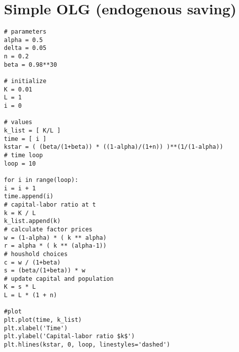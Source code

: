 \documentclass[10pt,a4paper]{book}
\theoremstyle{definition}\newtheorem{definition}{Definition}
\theoremstyle{definition}\newtheorem{fact}{Fact}
\theoremstyle{definition}\newtheorem{ex}{Ex.}
\theoremstyle{definition}\newtheorem{project}{Project}
\theoremstyle{definition}\newtheorem{problem}{Problem}
\theoremstyle{definition}\newtheorem{example}{Example}
\numberwithin{theorem}{chapter}
\numberwithin{corollary}{chapter}
\numberwithin{assumption}{chapter}
\numberwithin{definition}{chapter}
\numberwithin{prop}{chapter}
\numberwithin{notation}{chapter}
\numberwithin{problem}{chapter}
\numberwithin{example}{chapter}
\numberwithin{fact}{chapter}
\numberwithin{ex}{chapter}
\begin{document}
\section{Simple OLG (endogenous saving)}

\begin{verbatim}
# parameters
alpha = 0.5
delta = 0.05
n = 0.2
beta = 0.98**30

# initialize
K = 0.01
L = 1
i = 0

# values
k_list = [ K/L ]
time = [ i ]
kstar = ( (beta/(1+beta)) * ((1-alpha)/(1+n)) )**(1/(1-alpha))
# time loop
loop = 10

for i in range(loop):
i = i + 1
time.append(i)
# capital-labor ratio at t 
k = K / L
k_list.append(k)
# calculate factor prices
w = (1-alpha) * ( k ** alpha)
r = alpha * ( k ** (alpha-1))
# houshold choices
c = w / (1+beta)
s = (beta/(1+beta)) * w 
# update capital and population
K = s * L
L = L * (1 + n)

#plot
plt.plot(time, k_list)
plt.xlabel('Time')
plt.ylabel('Capital-labor ratio $k$')
plt.hlines(kstar, 0, loop, linestyles='dashed')
\end{verbatim}


	\normalem
	\printbibliography
	
\end{document}
